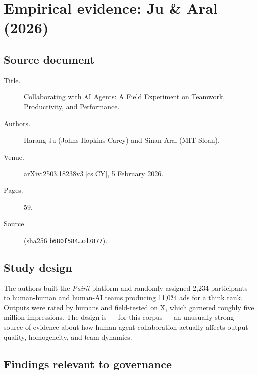 \chapter{Empirical evidence: Ju \& Aral (2026)}
\label{ch:empirical}

\section{Source document}

\begin{description}
  \item[Title.] Collaborating with AI Agents: A Field Experiment on
    Teamwork, Productivity, and Performance.
  \item[Authors.] Harang Ju (Johns Hopkins Carey) and Sinan Aral (MIT
    Sloan).
  \item[Venue.] arXiv:2503.18238v3 [cs.CY], 5 February 2026.
  \item[Pages.] 59.
  \item[Source.] 
    (sha256 \texttt{b680f584\ldots cd7877}).
\end{description}

\section{Study design}

The authors built the \emph{Pairit} platform and randomly assigned 2{,}234
participants to human-human and human-AI teams producing 11{,}024 ads
for a think tank. Outputs were rated by humans and field-tested on X,
which garnered roughly five million impressions. The design is --- for
this corpus --- an unusually strong source of evidence about how
human-agent collaboration actually affects output quality, homogeneity,
and team dynamics.

\section{Findings relevant to governance}

